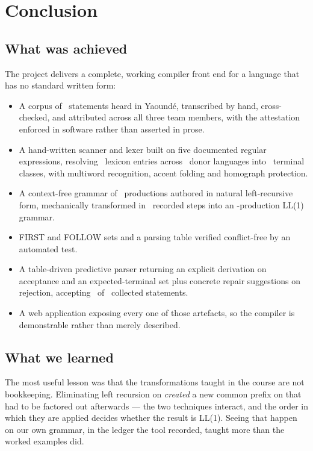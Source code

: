 \section{Conclusion}

\subsection{What was achieved}

The project delivers a complete, working compiler front end for a language that has no
standard written form:

\begin{itemize}[leftmargin=1.4em, itemsep=0.15em]
  \item A corpus of \CorpusTotal\ statements heard in Yaound\'e, transcribed by hand,
        cross-checked, and attributed across all three team members, with the attestation
        enforced in software rather than asserted in prose.
  \item A hand-written scanner and lexer built on five documented regular expressions,
        resolving \LexiconTotal\ lexicon entries across \OriginCount\ donor languages into
        \TerminalCount\ terminal classes, with multiword recognition, accent folding and
        homograph protection.
  \item A context-free grammar of \ProductionCount\ productions authored in natural
        left-recursive form, mechanically transformed in \LedgerSteps\ recorded steps into
        an \ExecProductionCount-production LL(1) grammar.
  \item FIRST and FOLLOW sets and a parsing table verified conflict-free by an automated
        test.
  \item A table-driven predictive parser returning an explicit derivation on acceptance and
        an expected-terminal set plus concrete repair suggestions on rejection, accepting
        \CorpusAccepted\ of \CorpusTotal\ collected statements.
  \item A web application exposing every one of those artefacts, so the compiler is
        demonstrable rather than merely described.
\end{itemize}

\subsection{What we learned}

The most useful lesson was that the transformations taught in the course are not
bookkeeping. Eliminating left recursion on  \emph{created} a new common prefix
on  that had to be factored out afterwards --- the two techniques interact, and the
order in which they are applied decides whether the result is LL(1). Seeing that happen on
our own grammar, in the ledger the tool recorded, taught more than the worked examples did.

